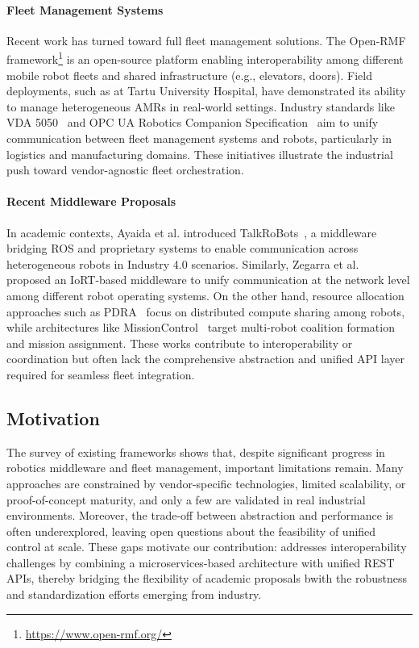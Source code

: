 \documentclass[conference]{IEEEtran}
\begin{document}
\paragraph{Fleet Management Systems} 
Recent work has turned toward full fleet management solutions. 
%
The Open-RMF framework\footnote{\url{https://www.open-rmf.org/}} is an open-source platform 
 enabling interoperability among different mobile robot fleets and shared infrastructure (e.g., elevators, doors). 
% 
Field deployments, such as at Tartu University Hospital, have demonstrated its ability 
 to manage heterogeneous AMRs in real-world settings. 
% 
Industry standards like VDA 5050~\cite{franke2023identification} 
 and OPC UA Robotics Companion Specification~\cite{DBLP:conf/etfa/ProfanterB0K19} 
 aim to unify communication between fleet management systems and robots, 
 particularly in logistics and manufacturing domains. 
%  
These initiatives illustrate the industrial push toward vendor-agnostic fleet orchestration.

\paragraph{Recent Middleware Proposals} 
In academic contexts, Ayaida et al. introduced TalkRoBots~\cite{ayaida2022fi}, 
 a middleware bridging ROS and proprietary systems to enable communication 
 across heterogeneous robots in Industry 4.0 scenarios. 
% 
Similarly, Zegarra et al.~\cite{cuadroszegarra2024jsan} proposed an IoRT-based middleware 
 to unify communication at the network level among different robot operating systems. 
% 
On the other hand, resource allocation approaches such as PDRA~\cite{DBLP:conf/iros/RossiVNSH20} 
 focus on distributed compute sharing among robots, 
 while architectures like MissionControl~\cite{DBLP:journals/jss/RodriguesCAMRP22} 
  target multi-robot coalition formation and mission assignment. 
%  
These works contribute to interoperability or coordination but often lack the comprehensive abstraction 
 and unified API layer required for seamless fleet integration.

\subsection{Motivation}
The survey of existing frameworks shows that, 
 despite significant progress in robotics middleware and fleet management, important limitations remain. 
% 
Many approaches are constrained by vendor-specific technologies, limited scalability, 
 or proof-of-concept maturity, and only a few are validated in real industrial environments. 
% 
Moreover, the trade-off between abstraction and performance is often underexplored, 
 leaving open questions about the feasibility of unified control at scale. 
% 
These gaps motivate our contribution: 
 \approach{} addresses interoperability challenges by combining a microservices-based architecture 
  with unified REST APIs, thereby bridging the flexibility of academic proposals 
   bwith the robustness and standardization efforts emerging from industry.
\end{document}
